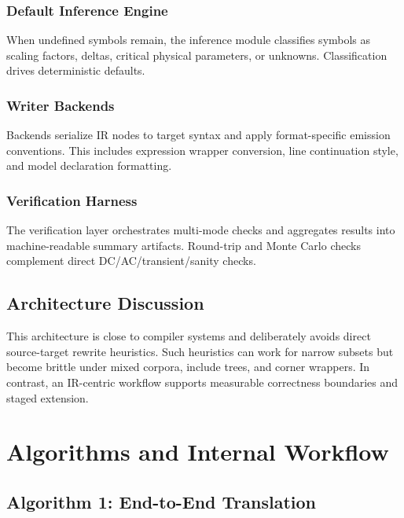 \documentclass[12pt,a4paper,oneside]{report}
\begin{document}
\subsection{Default Inference Engine}
When undefined symbols remain, the inference module classifies symbols as scaling factors, deltas, critical physical parameters, or unknowns. Classification drives deterministic defaults.

\subsection{Writer Backends}
Backends serialize IR nodes to target syntax and apply format-specific emission conventions. This includes expression wrapper conversion, line continuation style, and model declaration formatting.

\subsection{Verification Harness}
The verification layer orchestrates multi-mode checks and aggregates results into machine-readable summary artifacts. Round-trip and Monte Carlo checks complement direct DC/AC/transient/sanity checks.

\section{Architecture Discussion}
This architecture is close to compiler systems and deliberately avoids direct source-target rewrite heuristics. Such heuristics can work for narrow subsets but become brittle under mixed corpora, include trees, and corner wrappers. In contrast, an IR-centric workflow supports measurable correctness boundaries and staged extension.

\chapter{Algorithms and Internal Workflow}

\section{Algorithm 1: End-to-End Translation}
\end{document}
